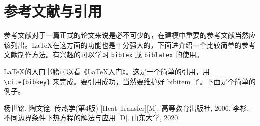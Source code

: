 \documentclass[withoutpreface,bwprint]{cumcmthesis} %
\numberwithin{equation}{subsection}
\begin{document}
\section{参考文献与引用}

参考文献对于一篇正式的论文来说是必不可少的，在建模中重要的参考文献当然应该列出。\LaTeX{}在这方面的功能也是十分强大的，下面进介绍一个比较简单的参考文献制作方法。有兴趣的可以学习 \verb|bibtex| 或 \verb|biblatex| 的使用。

\LaTeX{}的入门书籍可以看《\LaTeX{}入门》\cite{liuhaiyang2013latex}。这是一个简单的引用，用 \verb|\cite{bibkey}| 来完成。要引用成功，当然要维护好 bibitem 了。下面是个简单的例子。

\newpage

\begin{thebibliography}{9}%
    杨世铭, 陶文铨. 传热学(第4版) [Heat Transfer][M]. 高等教育出版社, 2006.
    \bibitem{}李杉. 不同边界条件下热方程的解法与应用 [D]. 山东大学, 2020.
\end{thebibliography}
\end{document}
